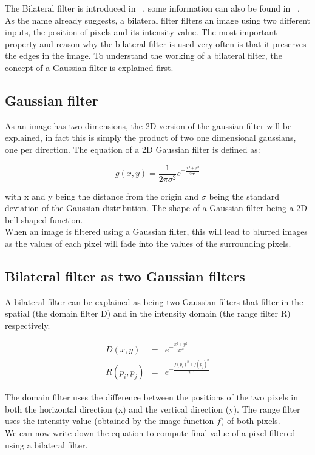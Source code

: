The Bilateral filter is introduced in ~\cite{710815}, some information can also be found in ~\cite{bilfilter}.
\\
As the name already suggests, a bilateral filter filters an image using two different inputs, the position of pixels and its intensity value.
The most important property and reason why the bilateral filter is used very often is that it preserves the edges in the image.
To understand the working of a bilateral filter, the concept of a Gaussian filter is explained first.

\subsection{Gaussian filter}
As an image has two dimensions, the 2D version of the gaussian filter will be explained, in fact this is simply the product of two one dimensional gaussians, one per direction.
The equation of a 2D Gaussian filter is defined as:

\begin{equation}
   g(x,y) = \frac{1}{2\pi\sigma^2}e^{-\frac{x^{2}+y^{2}}{2\sigma^{2}}}
\end{equation}

with x and y being the distance from the origin and $\sigma$ being the standard deviation of the Gaussian distribution.
The shape of a Gaussian filter being a 2D bell shaped function.
\\
When an image is filtered using a Gaussian filter, this will lead to blurred images as the values of each pixel will fade into the values of the surrounding pixels.


\subsection{Bilateral filter as two Gaussian filters}
A bilateral filter can be explained as being two Gaussian filters that filter in the spatial (the domain filter D) and in the intensity domain (the range filter R) respectively.

\begin{equation}
  \begin{aligned}
    D(x,y) &=& e^{-\frac{x^{2}+y^{2}}{2\sigma^{2}}} \\
    R(p_i, p_j) &=& e^{-\frac{f(p_i)^{2}+f(p_j)^{2}}{2\sigma^{2}}}
  \end{aligned}
\end{equation}

The domain filter uses the difference between the positions of the two pixels in both the horizontal direction (x) and the vertical direction (y). 
The range filter uses the intensity value (obtained by the image function $f$) of both pixels.
\\
We can now write down the equation to compute final value of a pixel filtered using a bilateral filter.

